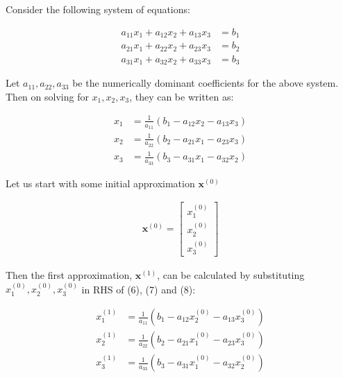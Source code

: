 \documentclass[main]{subfiles}
\begin{document}
\vspace{15mm}
Consider the following system of equations: 

    \begin{align}\label{eq1}
        a_{11}x_1 + a_{12}x_2 + a_{13}x_3 &= b_1 \\
        a_{21}x_1 + a_{22}x_2 + a_{23}x_3 &= b_2 \\
        a_{31}x_1 + a_{32}x_2 + a_{33}x_3 &= b_3 
    \end{align}

\vspace{13mm}
Let $a_{11}, a_{22}, a_{33}$ be the numerically dominant coefficients for the above system.
Then on solving for $x_1, x_2, x_3$, they can be written as:

    \begin{align}\label{eq1}
        x_1  &= \frac{1}{a_{11}}(b_1 - a_{12}x_2 - a_{13}x_3) \\
        x_2  &= \frac{1}{a_{22}}(b_2 - a_{21}x_1 - a_{23}x_3)  \\
        x_3  &= \frac{1}{a_{33}}(b_3 - a_{31}x_1 - a_{32}x_2) 
    \end{align}

Let us start with some initial approximation $\textbf{x}^{(0)}$ 

    \begin{align*}\label{eq1}
    \textbf{x}^{(0)} = \begin{bmatrix}
        x_1^{(0)}\\
        x_2^{(0)}\\
        x_3^{(0)}
    \end{bmatrix}     
    \end{align*}

    Then the first approximation, $\textbf{x}^{(1)}$, can be calculated by substituting $x_1^{(0)}, x_2^{(0)}, x_3^{(0)}$ in RHS of (6), (7) and (8):

    \begin{align*}
        x_1^{(1)}  &= \frac{1}{a_{11}}(b_1 - a_{12}x_2^{(0)} - a_{13}x_3^{(0)}) \\
        x_2^{(1)}  &= \frac{1}{a_{22}}(b_2 - a_{21}x_1^{(0)} - a_{23}x_3^{(0)})  \\
        x_3^{(1)}  &= \frac{1}{a_{33}}(b_3 - a_{31}x_1^{(0)} - a_{32}x_2^{(0)}) 
    \end{align*}
\end{document}
